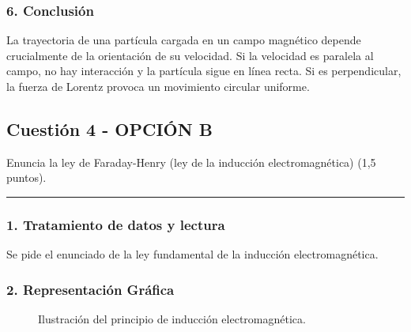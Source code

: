 \subsubsection*{6. Conclusión}
\begin{cajaconclusion}
La trayectoria de una partícula cargada en un campo magnético depende crucialmente de la orientación de su velocidad. Si la velocidad es paralela al campo, no hay interacción y la partícula sigue en línea recta. Si es perpendicular, la fuerza de Lorentz provoca un movimiento circular uniforme.
\end{cajaconclusion}

\newpage

\subsection{Cuestión 4 - OPCIÓN B}
\label{subsec:4B_2009_sep_ext}

\begin{cajaenunciado}
Enuncia la ley de Faraday-Henry (ley de la inducción electromagnética) (1,5 puntos).
\end{cajaenunciado}
\hrule

\subsubsection*{1. Tratamiento de datos y lectura}
Se pide el enunciado de la ley fundamental de la inducción electromagnética.

\subsubsection*{2. Representación Gráfica}
\begin{figure}[H]
    \centering
    \caption{Ilustración del principio de inducción electromagnética.}
\end{figure}

